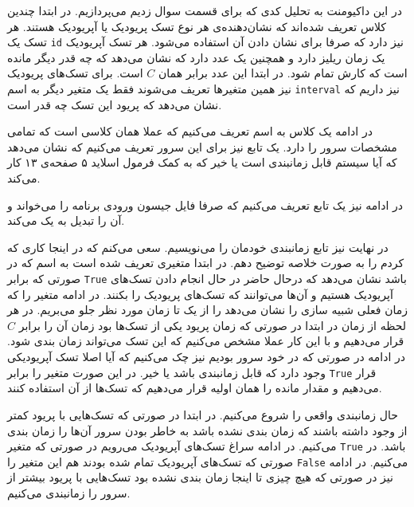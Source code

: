 \documentclass[]{article}
\begin{document}
\printheader

در این داکیومنت به تحلیل کدی که برای قسمت سوال زدیم می‌پردازیم.
در ابتدا چندین کلاس تعریف شده‌اند که نشان‌دهنده‌ی هر نوع تسک پریودیک یا آپریودیک هستند.
هر تسک یک
\verb|id|
نیز دارد که صرفا برای نشان دادن آن استفاده می‌شود.
هر تسک آپریودیک یک زمان ریلیز دارد و همچنین یک عدد دارد که نشان می‌دهد که چه قدر دیگر مانده
است که کارش تمام شود. در ابتدا این عدد برابر همان
$C$
است. برای تسک‌های پریودیک نیز همین متغیر‌ها تعریف می‌شوند فقط یک متغیر دیگر به اسم
\verb|interval|
نیز داریم که نشان می‌دهد که پریود این تسک چه قدر است.

در ادامه یک کلاس به اسم
تعریف می‌کنیم که عملا همان کلاسی است که تمامی مشخصات سرور را دارد. یک تابع نیز برای این
سرور تعریف می‌کنیم که نشان می‌دهد که آیا سیستم قابل زمانبندی است یا خیر که به کمک
فرمول اسلاید ۵ صفحه‌ی ۱۳ کار می‌کند.

در ادامه نیز یک تابع تعریف می‌کنیم که صرفا فایل جیسون ورودی برنامه را می‌خواند و آن را تبدیل
به یک
می‌کند.

در نهایت نیز تابع زمانبندی خودمان را می‌نویسیم. سعی می‌کنم که در اینجا کاری که کردم را به صورت خلاصه
توضیح دهم. در ابتدا متغیری تعریف شده است به اسم
که در صورتی که برابر
\verb|True|
باشد نشان می‌دهد که درحال حاضر در حال انجام دادن تسک‌های آپریودیک هستیم و آن‌ها می‌توانند که
تسک‌های پریودیک را
بکنند. در ادامه متغیر
را که زمان فعلی شبیه سازی را نشان می‌دهد را از یک تا زمان مورد نظر جلو می‌بریم.
در هر لحظه از زمان در ابتدا در صورتی که زمان پریود یکی از تسک‌ها بود زمان
آن را برابر
$C$
قرار می‌دهیم و با این کار عملا مشخص می‌کنیم که این تسک می‌تواند زمان بندی شود.
در ادامه در صورتی که در
خود سرور بودیم نیز چک می‌کنیم که آیا اصلا تسک آپریودیکی وجود دارد که قابل زمانبندی باشد
یا خیر. در این صورت متغیر
را برابر
\verb|True|
قرار می‌دهیم و مقدار
مانده را همان
اولیه قرار می‌دهیم که تسک‌ها از آن استفاده کنند.

حال زمانبندی واقعی را شروع می‌کنیم. در ابتدا در صورتی که تسک‌هایی با پریود کمتر از
وجود داشته باشند که زمان بندی نشده باشد به خاطر
بودن سرور آن‌ها را زمان بندی می‌کنیم. در ادامه سراغ تسک‌های
آپریودیک می‌رویم در صورتی که متغیر
\verb|True|
باشد. در صورتی که تسک‌های آپریودیک تمام شده بودند هم این متغیر را
\verb|False|
می‌کنیم.
در ادامه نیز در صورتی که هیچ چیزی تا اینجا زمان بندی نشده بود تسک‌هایی با پریود بیشتر از سرور
را زمانبندی می‌کنیم.
\end{document}
